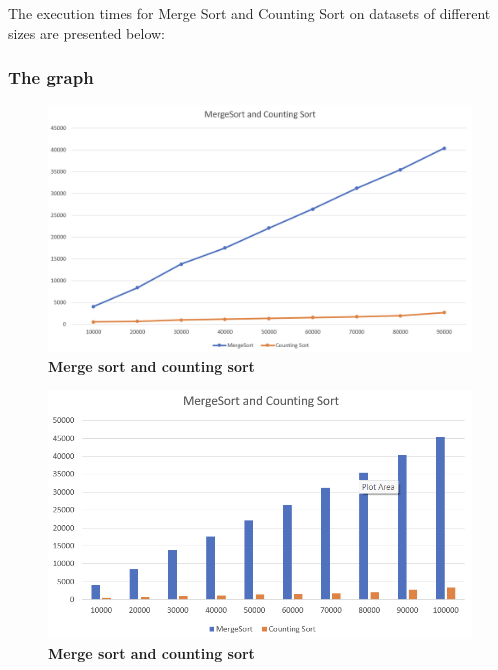 \documentclass[12pt,twocolumn]{article}
\begin{document}
\cite{googlescholar}
The execution times for Merge Sort and Counting Sort on datasets of different sizes are presented below:
\subsubsection{The graph}
\begin{figure}[H]
  \centering
  \includegraphics[width=1\linewidth]{mergeVcounting_1.png} 
  \caption{\textbf{Merge sort and counting sort}}
  \label{fig:my_label}
\end{figure}
\begin{figure}[H]
    \centering
    \includegraphics[width=1\linewidth]{mergeVcounting_2.png}
    \caption{\textbf{Merge sort and counting sort}}
    \label{fig:enter-label}
\end{figure}
\end{document}
